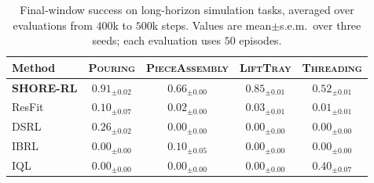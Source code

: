 \documentclass[letterpaper]{article} %
\begin{document}
\begin{table}[t]
\centering
\small
\setlength{\tabcolsep}{0pt}
\begin{tabular*}{\columnwidth}{@{\extracolsep{\fill}}lcccc}
\toprule
Method & \textsc{Pouring} & \textsc{PieceAssembly} & \textsc{LiftTray} & \textsc{Threading} \\
\midrule
\textbf{SHORE-RL} & $\mathbf{0.91}_{\scriptscriptstyle\mathbf{\pm 0.02}}$ & $\mathbf{0.66}_{\scriptscriptstyle\mathbf{\pm 0.00}}$ & $\mathbf{0.85}_{\scriptscriptstyle\mathbf{\pm 0.01}}$ & $\mathbf{0.52}_{\scriptscriptstyle\mathbf{\pm 0.01}}$ \\
ResFit & $0.10_{\scriptscriptstyle\pm 0.07}$ & $0.02_{\scriptscriptstyle\pm 0.00}$ & $0.03_{\scriptscriptstyle\pm 0.01}$ & $0.01_{\scriptscriptstyle\pm 0.01}$ \\
DSRL & $0.26_{\scriptscriptstyle\pm 0.02}$ & $0.00_{\scriptscriptstyle\pm 0.00}$ & $0.00_{\scriptscriptstyle\pm 0.00}$ & $0.00_{\scriptscriptstyle\pm 0.00}$ \\
IBRL & $0.00_{\scriptscriptstyle\pm 0.00}$ & $0.10_{\scriptscriptstyle\pm 0.05}$ & $0.00_{\scriptscriptstyle\pm 0.00}$ & $0.00_{\scriptscriptstyle\pm 0.00}$ \\
IQL & $0.00_{\scriptscriptstyle\pm 0.00}$ & $0.00_{\scriptscriptstyle\pm 0.00}$ & $0.00_{\scriptscriptstyle\pm 0.00}$ & $0.40_{\scriptscriptstyle\pm 0.07}$ \\
\bottomrule
\end{tabular*}
\caption{Final-window success on long-horizon simulation tasks, averaged over
evaluations from $400$k to $500$k steps. Values are mean$\pm$s.e.m.\ over three
seeds; each evaluation uses $50$ episodes.}
\label{tab:main}
\end{table}


\end{document}
